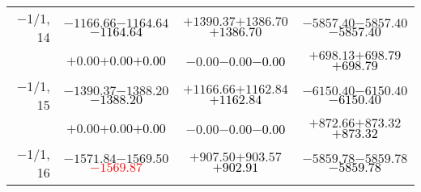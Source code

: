 \documentclass[compress]{beamer}
\begin{document}
\begin{frame}
{\begin{tabular}{r | c | c | c}
$-$1/1, 14 & $-1166.66$\hspace{0.1 cm}$-1164.64$\hspace{0.1 cm}\textcolor{black}{$-1164.64$} & $+1390.37$\hspace{0.1 cm}$+1386.70$\hspace{0.1 cm}\textcolor{black}{$+1386.70$} & $-5857.40$\hspace{0.1 cm}$-5857.40$\hspace{0.1 cm}\textcolor{black}{$-5857.40$} \\
           & $+0.00$\hspace{0.1 cm}$+0.00$\hspace{0.1 cm}\textcolor{black}{$+0.00$} & $-0.00$\hspace{0.1 cm}$-0.00$\hspace{0.1 cm}\textcolor{black}{$-0.00$} & $+698.13$\hspace{0.1 cm}$+698.79$\hspace{0.1 cm}\textcolor{black}{$+698.79$} \\
$-$1/1, 15 & $-1390.37$\hspace{0.1 cm}$-1388.20$\hspace{0.1 cm}\textcolor{black}{$-1388.20$} & $+1166.66$\hspace{0.1 cm}$+1162.84$\hspace{0.1 cm}\textcolor{black}{$+1162.84$} & $-6150.40$\hspace{0.1 cm}$-6150.40$\hspace{0.1 cm}\textcolor{black}{$-6150.40$} \\
           & $+0.00$\hspace{0.1 cm}$+0.00$\hspace{0.1 cm}\textcolor{black}{$+0.00$} & $-0.00$\hspace{0.1 cm}$-0.00$\hspace{0.1 cm}\textcolor{black}{$-0.00$} & $+872.66$\hspace{0.1 cm}$+873.32$\hspace{0.1 cm}\textcolor{black}{$+873.32$} \\
$-$1/1, 16 & $-1571.84$\hspace{0.1 cm}$-1569.50$\hspace{0.1 cm}\textcolor{red}{$-1569.87$} & $+907.50$\hspace{0.1 cm}$+903.57$\hspace{0.1 cm}\textcolor{black}{$+902.91$} & $-5859.78$\hspace{0.1 cm}$-5859.78$\hspace{0.1 cm}\textcolor{black}{$-5859.78$} \\

\end{tabular}}
\end{frame}
\end{document}
